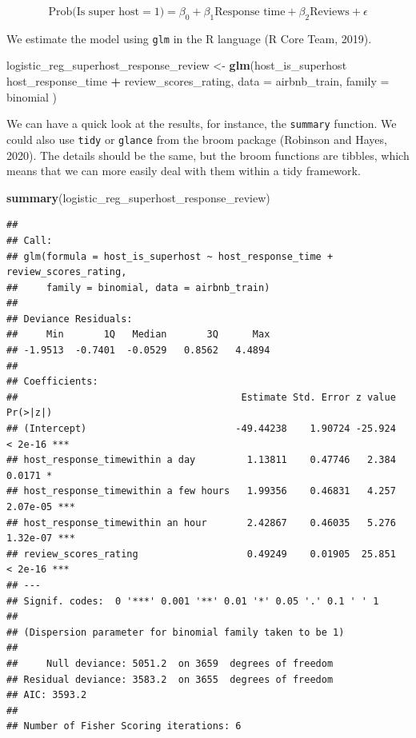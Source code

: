 \documentclass[
]{book}
\newenvironment{Shaded}{\begin{snugshade}}{\end{snugshade}}
\newcommand{\DataTypeTok}[1]{\textcolor[rgb]{0.13,0.29,0.53}{#1}}
\newcommand{\KeywordTok}[1]{\textcolor[rgb]{0.13,0.29,0.53}{\textbf{#1}}}
\newcommand{\NormalTok}[1]{#1}
\newcommand{\OperatorTok}[1]{\textcolor[rgb]{0.81,0.36,0.00}{\textbf{#1}}}
\newcommand{\StringTok}[1]{\textcolor[rgb]{0.31,0.60,0.02}{#1}}
\begin{document}
\[\mbox{Prob(Is super host} = 1) = \beta_0 + \beta_1 \mbox{Response time} + \beta_2 \mbox{Reviews} + \epsilon\]

We estimate the model using \texttt{glm} in the R language (R Core Team, 2019).

\begin{Shaded}
\begin{Highlighting}[]
\NormalTok{logistic_reg_superhost_response_review <-}\StringTok{ }\KeywordTok{glm}\NormalTok{(host_is_superhost }\OperatorTok{~}\StringTok{ }
\StringTok{                                                }\NormalTok{host_response_time }\OperatorTok{+}\StringTok{ }
\StringTok{                                                }\NormalTok{review_scores_rating,}
                                              \DataTypeTok{data =}\NormalTok{ airbnb_train,}
                                              \DataTypeTok{family =}\NormalTok{ binomial}
\NormalTok{                                              )}
\end{Highlighting}
\end{Shaded}

We can have a quick look at the results, for instance, the \texttt{summary} function. We could also use \texttt{tidy} or \texttt{glance} from the broom package (Robinson and Hayes, 2020). The details should be the same, but the broom functions are tibbles, which means that we can more easily deal with them within a tidy framework.

\begin{Shaded}
\begin{Highlighting}[]
\KeywordTok{summary}\NormalTok{(logistic_reg_superhost_response_review)}
\end{Highlighting}
\end{Shaded}

\begin{verbatim}
## 
## Call:
## glm(formula = host_is_superhost ~ host_response_time + review_scores_rating, 
##     family = binomial, data = airbnb_train)
## 
## Deviance Residuals: 
##     Min       1Q   Median       3Q      Max  
## -1.9513  -0.7401  -0.0529   0.8562   4.4894  
## 
## Coefficients:
##                                       Estimate Std. Error z value Pr(>|z|)    
## (Intercept)                          -49.44238    1.90724 -25.924  < 2e-16 ***
## host_response_timewithin a day         1.13811    0.47746   2.384   0.0171 *  
## host_response_timewithin a few hours   1.99356    0.46831   4.257 2.07e-05 ***
## host_response_timewithin an hour       2.42867    0.46035   5.276 1.32e-07 ***
## review_scores_rating                   0.49249    0.01905  25.851  < 2e-16 ***
## ---
## Signif. codes:  0 '***' 0.001 '**' 0.01 '*' 0.05 '.' 0.1 ' ' 1
## 
## (Dispersion parameter for binomial family taken to be 1)
## 
##     Null deviance: 5051.2  on 3659  degrees of freedom
## Residual deviance: 3583.2  on 3655  degrees of freedom
## AIC: 3593.2
## 
## Number of Fisher Scoring iterations: 6
\end{verbatim}
\end{document}
